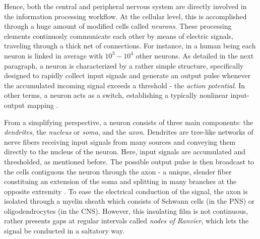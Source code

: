 \documentclass[11pt, a4paper]{report}
\theoremstyle{theorem}
\numberwithin{equation}{section}
\numberwithin{figure}{section}
\begin{document}
		Hence, both the central and peripheral nervous system are directly involved in the information processing workflow. At the cellular level, this is accomplished through a huge amount of modified cells called \emph{neurons}. These processing elements continuosly communicate each other by means of electric signals, traveling through a thick net of connections. For instance, in a human being each neuron is linked in average with $10^3 - 10^4$ other neurons. As detailed in the next paragraph, a neuron is characterized by a rather simple structure, specifically designed to rapidly collect input signals and generate an output pulse whenever the accumulated incoming signal exceeds a threshold - the \emph{action potential}. In other terms, a neuron acts as a switch, establishing a typically nonlinear input-output mapping \cite{Kri}.
		
		From a simplifying perspective, a neuron consists of three main components: the \emph{dendrites}, the \emph{nucleus} or \emph{soma}, and the \emph{axon}. Dendrites are tree-like networks of nerve fibers receiving input signals from many sources and conveying them directly to the nucleus of the neuron. Here, input signals are accumulated and thresholded, as mentioned before. The possible output pulse is then broadcast to the cells contiguous the neuron through the axon - a unique, slender fiber constituing an extension of the soma and splitting in many branches at the opposite extremity \cite{SD}. To ease the electrical conduction of the signal, the axon is isolated through a myelin sheath which consists of Schwann cells (in the PNS) or oligodendrocytes (in the CNS). However, this insulating film is not continuous, rather presents gaps at regular intervals called \emph{nodes of Ranvier}, which lets the signal be conducted in a saltatory way.
		
\end{document}
